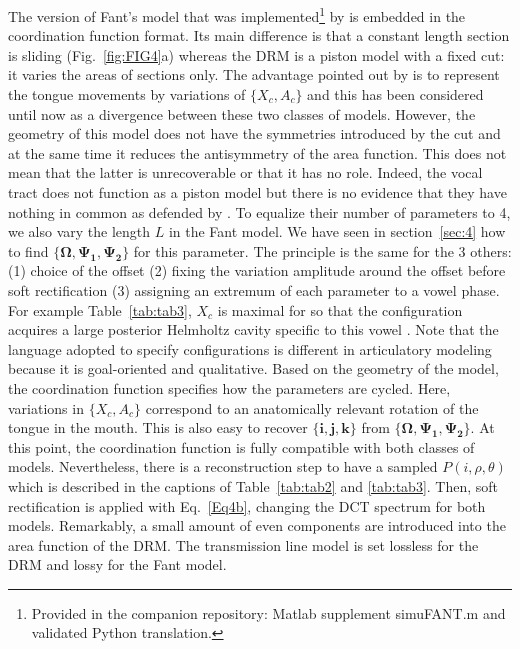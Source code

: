 \documentclass[10pt,twocolumn]{article}
\let\cite\citep                             %
\begin{document}
The version of Fant's model that was implemented\footnote{Provided in the companion repository: Matlab supplement \mbox{simuFANT.m} and validated Python translation.} by \cite{Badin1990} is embedded in the coordination function format. Its main difference is that a constant length section is sliding (Fig.~\ref{fig:FIG4}a) whereas the DRM is a piston model with a fixed cut: it varies the areas of sections only. The advantage pointed out by \cite{BoePerrier1990} is to represent the tongue movements by variations of $\{X_c,A_c\}$ and this has been considered until now as a divergence between these two classes of models. However, the geometry of this model does not have the symmetries introduced by the cut and at the same time it reduces the antisymmetry of the area function. This does not mean that the latter is unrecoverable or that it has no role. Indeed, the vocal tract does not function as a piston model but there is no evidence that they have nothing in common as defended by \cite{BoePerrier1990}. To equalize their number of parameters to 4, we also vary the length $L$ in the Fant model. We have seen in section~\ref{sec:4} how to find $\{\bm{\Omega},\bm{\Psi_1},\bm{\Psi_2}\}$ for this parameter. The principle is the same for the 3 others: (1) choice of the offset (2) fixing the variation amplitude around the offset before soft rectification (3) assigning an extremum of each parameter to a vowel phase. For example Table~\ref{tab:tab3}, $X_c$ is maximal for \textipa{[i]} so that the configuration acquires a large posterior Helmholtz cavity specific to this vowel \cite{Boe2019}. Note that the language adopted to specify configurations is different in articulatory modeling because it is goal-oriented and qualitative. Based on the geometry of the model, the coordination function specifies how the parameters are cycled. Here, variations in $\{X_c,A_c\}$ correspond to an anatomically relevant rotation of the tongue in the mouth. This is also easy to recover $\{\bm{i},\bm{j}, \bm{k}\}$ from $\{\bm{\Omega},\bm{\Psi_1},\bm{\Psi_2}\}$. At this point, the coordination function is fully compatible with both classes of models. Nevertheless, there is a reconstruction step to have a sampled $P(i,\rho,\theta)$ which is described in the captions of Table~\ref{tab:tab2} and \ref{tab:tab3}. Then, soft rectification is applied with Eq.~\ref{Eq4b}, changing the DCT spectrum for both models. Remarkably, a small amount of even components are introduced into the area function of the DRM. The transmission line model is set lossless for the DRM and lossy for the Fant model.
\end{document}
